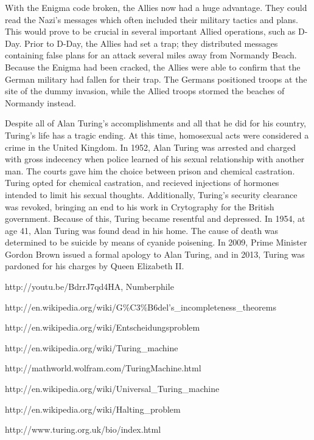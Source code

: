 \documentclass[12pt]{article}
\theoremstyle{mystyle}
\begin{document}
With the Enigma code broken, the Allies now had a huge advantage. They could
read the Nazi's messages which often included their military tactics and plans.
This would prove to be crucial in several important Allied operations, such as
D-Day. Prior to D-Day, the Allies had set a trap; they distributed messages
containing false plans for an attack several miles away from Normandy Beach. Because the
Enigma had been cracked, the Allies were able to confirm that the German
military  had fallen for their trap. The Germans positioned troops at the site
of the dummy invasion, while the Allied troops stormed the beaches of Normandy instead.


Despite all of Alan Turing's accomplishments and all that he did for his
country, Turing's life has a tragic ending. At this time, homosexual acts were
considered a crime in the United Kingdom. In 1952, Alan Turing was arrested and
charged with gross indecency when police learned of his sexual relationship
with another man. The courts gave him the choice between prison and chemical
castration. Turing opted for chemical castration, and recieved injections of
hormones intended to limit his sexual thoughts. Additionally, Turing's security
clearance was revoked, bringing an end to his work in Crytography for the
British government. Because of this, Turing became resentful and depressed. In
1954, at age 41, Alan Turing was found dead in his home. The cause of death was
determined to be suicide by means of cyanide poisening. In 2009, Prime Minister
Gordon Brown issued a formal apology to Alan Turing, and in 2013, Turing was 
pardoned for his charges by Queen Elizabeth II.


\begin{thebibliography}{9}

http://youtu.be/BdrrJ7qd4HA,
Numberphile

\bibitem{}
http://en.wikipedia.org/wiki/G\%C3\%B6del's\_incompleteness\_theorems

\bibitem{}
http://en.wikipedia.org/wiki/Entscheidungsproblem

\bibitem{}
http://en.wikipedia.org/wiki/Turing\_machine

\bibitem{}
http://mathworld.wolfram.com/TuringMachine.html

\bibitem{}
http://en.wikipedia.org/wiki/Universal\_Turing\_machine

\bibitem{}
http://en.wikipedia.org/wiki/Halting\_problem

\bibitem{}
http://www.turing.org.uk/bio/index.html

\end{thebibliography}
\end{document}
